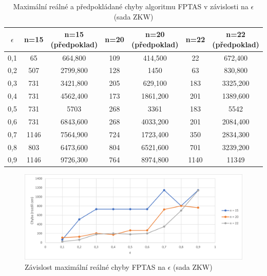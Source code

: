 \documentclass[12pt]{article}
\begin{document}
\begin{table}
    \begin{center}
         \begin{tabular}{|c | c | c | c | c | c | c|} 
         \hline
         $\epsilon$ & n=15 & n=15 (předpoklad) & n=20 & n=20 (předpoklad) & n=22 & n=22 (předpoklad) \\ [0.1ex] 
         \hline\hline
        0,1 & 65 & 664,800 & 109 & 414,500 & 22 & 672,400 \\
        \hline
        0,2 & 507 & 2799,800 & 128 & 1450 & 63 & 830,800 \\
        \hline
        0,3 & 731 & 3421,800 & 205 & 629,100 & 183 & 3325,200 \\
        \hline
        0,4 & 731 & 4562,400 & 173 & 1861,200 & 201 & 1389,600 \\
        \hline
        0,5 & 731 & 5703 & 268 & 3361 & 183 & 5542 \\
        \hline
        0,6 & 731 & 6843,600 & 268 & 4033,200 & 201 & 2084,400 \\
        \hline
        0,7 & 1146 & 7564,900 & 724 & 1723,400 & 350 & 2834,300 \\
        \hline
        0,8 & 803 & 6473,600 & 804 & 6521,600 & 701 & 3239,200 \\
        \hline
        0,9 & 1146 & 9726,300 & 764 & 8974,800 & 1140 & 11349 \\
        \hline
        \end{tabular}
        \caption{Maximální reálné a předpokládané chyby algoritmu FPTAS v závislosti na $\epsilon$ (sada ZKW)} \label{tab:zkw_fptas_eps_error}
    \end{center}
\end{table}

\begin{figure}[ht]\centering
    \includegraphics[width=1\textwidth, keepaspectratio]{graphs/ZKW/fptas/zkw_fptas_eps_error.png}
    \caption{Závislost maximální reálné chyby FPTAS na $\epsilon$ (sada ZKW)}
    \label{fig:zkw_fptas_eps_error}
\end{figure}
\end{document}
